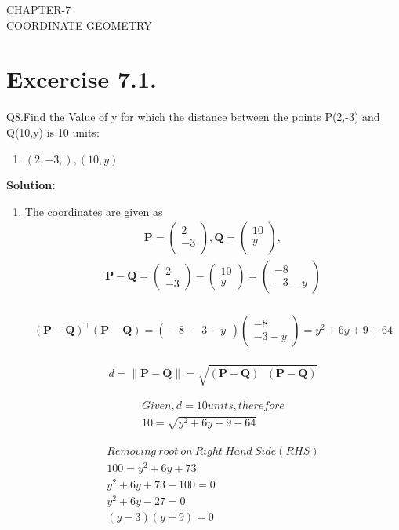 \documentclass[12pt]{article}
\providecommand{\brak}[1]{\ensuremath{\left(#1\right)}}
\providecommand{\norm}[1]{\left\lVert#1\right\rVert}
\newcommand{\solution}{\noindent \textbf{Solution: }}
\newcommand{\myvec}[1]{\ensuremath{\begin{pmatrix}#1\end{pmatrix}}}
\let\vec\mathbf
\begin{document}
\begin{center}
\textbf\large{CHAPTER-7 \\ COORDINATE GEOMETRY}

\end{center}
\section*{Excercise 7.1.}

Q8.Find the Value of y for which the distance between the points P(2,-3) and Q(10,y) is 10 units:
\begin{enumerate}
	\item $\brak{2,-3,}, \brak{10,y}$ 
\end{enumerate}
\solution
\begin{enumerate}
\item The coordinates are given as
	\begin{align}
	\vec{P} = \myvec{
		2\\
	   -3\\
		},
	\vec{Q} = \myvec{
	   10\\
		y\\
		},
	\end{align}
	\begin{align}
		\vec{P} - \vec{Q} = \myvec{2\\-3} - \myvec{10\\y} = \myvec{-8\\-3-y}\\		
	\end{align}
	
	
	
	
	\begin{align}
			(\vec{P}-\vec{Q})^\top (\vec{P}-\vec{Q}) = \myvec{-8&-3-y} \myvec{-8\\-3-y} = y^2+6y+9+64
	\end{align}
	
	
	\begin{align}
	d={\norm{\vec{P}-\vec{Q}}}=\sqrt{\brak{\vec{P} -\vec{Q}}^{\top}\brak{\vec{P} -\vec{Q}}}
	\end{align}
	
	\begin{align}
	Given, d=10 units, therefore \\
	10 = \sqrt{y^2+6y+9+64}
	\end{align}
	
	\begin{align}
		Removing\:root\:on\:Right\:Hand\:Side(RHS) \\
			100 = y^2 + 6y + 73 \\
				y^2 + 6y + 73 - 100 = 0 \\
					y^2 + 6y - 27 = 0 \\
						(y-3)(y+9) = 0 \\
	\end{align}
	

\end{enumerate}
\end{document}
